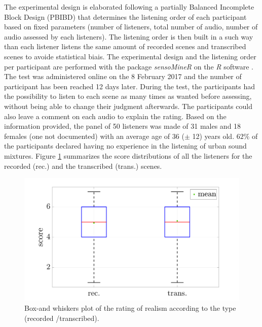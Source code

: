 \documentclass[review,5p,twocolumn,sort&compress,times]{elsarticle}
\begin{document}
The experimental design is elaborated following a partially Balanced Incomplete Block Design (PBIBD) \cite{john1977optimal} that determines the listening order of each participant based on fixed parameters (number of listeners, total number of audio, number of audio assessed by each listeners). The listening order is then built in a such way than each listener listens the same amount of recorded scenes and transcribed scenes to avoide statistical biais. The experimental design and the listening order per participant are performed with the package \textit{sensoMineR} on the \textit{R} software \cite{le_sensominer:_2008}.\\

The test was administered online on the 8 February 2017 and the number of participant has been reached 12 days later. During the test, the participants had the possibility to listen to each scene as many times as wanted before assessing, without being able to change their judgment afterwards. The participants could also leave a comment on each audio to explain the rating. Based on the information provided, the panel of 50 listeners was made of 31 males and 18 females (one not documented) with an average age of 36 ($\pm$ 12) years old. $62\%$ of the participants declared having no experience in the listening of urban sound mixtures. Figure \ref{fig:boxPlot_test} summarizes the score distributions of all the listeners for the recorded (rec.) and the transcribed (trans.) scenes. 

\begin{figure}[t]
\centering
\includegraphics[width=\linewidth]{figures/testPerceptif_boxplotType_EN.pdf} 
\caption{Box-and whiskers plot of the rating of realism according to the type (recorded /transcribed).}
\label{fig:boxPlot_test}
\end{figure}
\end{document}
